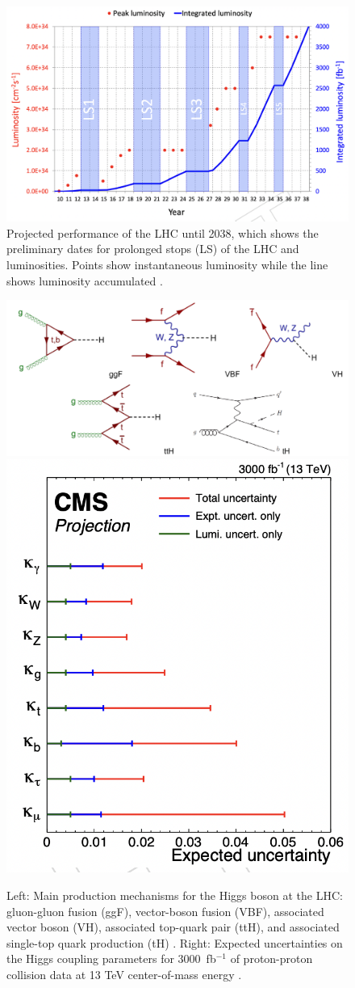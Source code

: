 \documentclass[final,12pt]{article}
\newcommand{\lumi}[1]{{#1~fb$^{-1}$}}
\begin{document}
\begin{figure}[H]
  \centering
  \includegraphics[width=0.8\columnwidth]{./HLLHCLumi.png}
  \caption{Projected performance of the LHC until 2038, which shows the preliminary dates for prolonged stops (LS) of the LHC and luminosities. Points show instantaneous luminosity while the line shows luminosity accumulated \cite{collaborations2019report}.}
  \label{figure6}
\end{figure}


 \begin{figure}[H]
   \centering
   \includegraphics[width=0.7\columnwidth]{./pg.png}
   \includegraphics[width=0.29\columnwidth]{./higgs_couplings.png}
   \caption{
     Left: Main production mechanisms for the Higgs boson at the LHC: gluon-gluon fusion (ggF), vector-boson fusion (VBF), associated vector boson (VH), associated top-quark pair (ttH), and  associated single-top quark production (tH)  \cite{Grojean:2017hsb}  \cite{Khachatryan:2015ota} .
     Right: Expected uncertainties on the Higgs coupling parameters for  \lumi{3000} of proton-proton collision data at 13 TeV center-of-mass energy \cite{Cepeda:2019klc}.
   }
   \label{figureKappasUncs}
 \end{figure}
\end{document}
